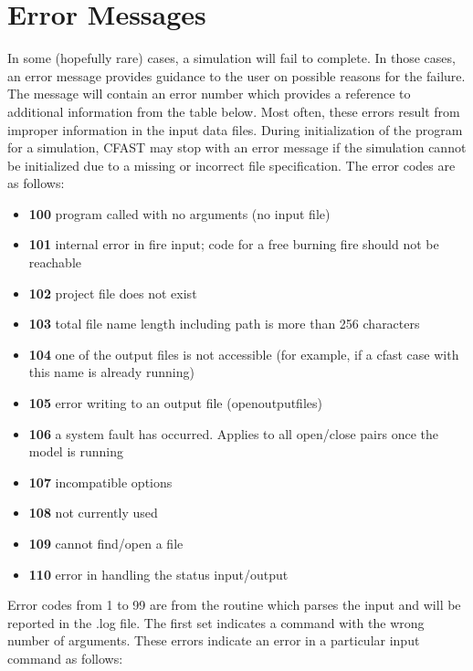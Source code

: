 \newpage

\section{Error Messages}

In some (hopefully rare) cases, a simulation will fail to complete. In those cases, an error message provides guidance to the user on possible reasons for the failure. The message will contain an error number which provides a reference to additional information from the table below. Most often, these errors result from improper information in the input data files.
During initialization of the program for a simulation, CFAST may stop with an error message if the simulation cannot be initialized due to a missing or incorrect file specification. The error codes are as follows:

\begin{itemize}
\item \textbf{100} program called with no arguments (no input file)
\item \textbf{101} internal error in fire input; code for a free burning fire should not be reachable
\item \textbf{102} project file does not exist
\item \textbf{103} total file name length including path  is more than 256 characters
\item \textbf{104} one of the output files is not accessible (for example, if a cfast case with this name is already running)
\item \textbf{105} error writing to an output file (openoutputfiles)
\item \textbf{106} a system fault has occurred. Applies to all open/close pairs once the model is running
\item \textbf{107} incompatible options
\item \textbf{108} not currently used
\item \textbf{109} cannot find/open a file
\item \textbf{110} error in handling the status input/output
\end{itemize}

Error codes from 1 to 99 are from the routine which parses the input and will be reported in the .log file.  The first set indicates a command with the wrong number of arguments. These errors indicate an error in a particular input command as follows:

